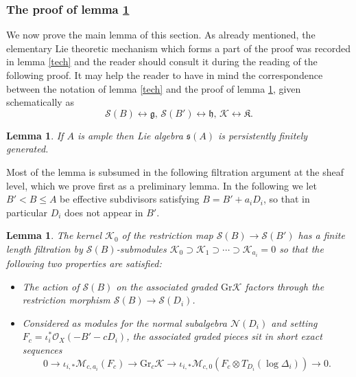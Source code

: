 \documentclass[12pt, oneside]{amsart}       %
\newtheorem{lemma}[theorem]{Lemma}
\theoremstyle{remark}
\renewcommand{\leq}{\leqslant}
\newcommand{\OO}{\mathcal{O}}
\newcommand{\g}{\mathfrak{g}}
\begin{document}
\subsubsection{The proof of lemma \ref{q fin gen}}We now prove the main lemma of this section. As already mentioned, the elementary Lie theoretic mechanism which forms a part of the proof was recorded in lemma \ref{tech} and the reader should consult it during the reading of the following proof. It may help the reader to have in mind the correspondence between the notation of lemma \ref{tech} and the proof of lemma \ref{q fin gen}, given schematically as $$\mathcal{S}(B)\leftrightarrow\g,\, \mathcal{S}(B')\leftrightarrow\mathfrak{h},\,\mathcal{K}\leftrightarrow\mathfrak{K}.$$ 

\begin{lemma}\label{q fin gen} If $A$ is ample then Lie algebra $\mathfrak{s}(A)$ is persistently finitely generated.
\end{lemma}


Most of the lemma is subsumed in the following filtration argument at the sheaf level, which we prove first as a preliminary lemma. In the following we let $B'< B\leq A$ be effective subdivisors satisfying $B=B'+a_iD_i$, so that in particular $D_i$ does not appear in $B'$.

\begin{lemma}\label{prelim} The kernel $\mathcal{K}_0$ of the restriction map $\mathcal{S}(B)\to\mathcal{S}(B')$ has a finite length filtration by $\mathcal{S}(B)$-submodules $\mathcal{K}_0\supset\mathcal{K}_1\supset\cdots\supset\mathcal{K}_{a_i}=0$ so that the following two properties are satisfied:
\begin{itemize}
\item The action of $\mathcal{S}(B)$ on the associated graded $\mathrm{Gr}\mathcal{K}$ factors through the restriction morphism $\mathcal{S}(B)\to\mathcal{S}(D_i)$.
\item Considered as modules for the normal subalgebra $\mathcal{N}(D_i)$ and setting $F_c=\iota_i^*\OO_X(-B'-cD_i)$, the associated graded pieces sit in short exact sequences
$$0\to\iota_{i,*}\mathcal{M}_{c,a_i}(F_c)\to\mathrm{Gr}_c\mathcal{K}\to\iota_{i,*}\mathcal{M}_{c,0}(F_c\otimes T_{D_i}(\log\Delta_i))\to0.$$
\end{itemize}
\end{lemma}
\end{document}
